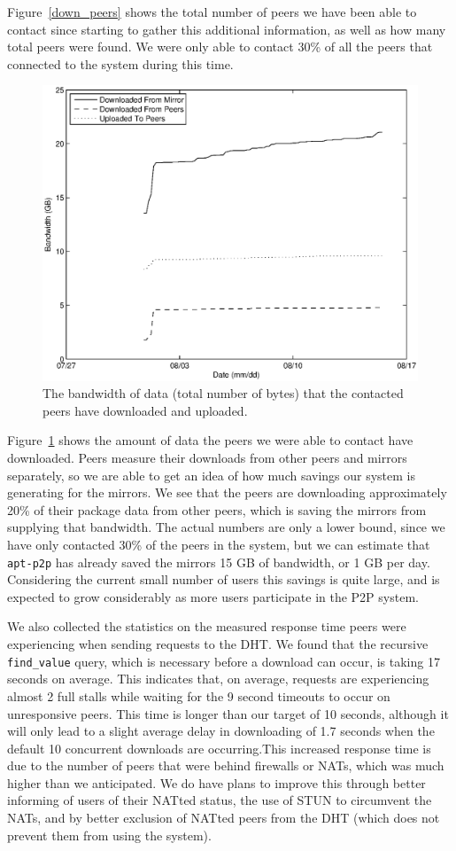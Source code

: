 \documentclass[conference]{IEEEtran}
\begin{document}
Figure~\ref{down_peers} shows the total number of peers we have been
able to contact since starting to gather this additional
information, as well as how many total peers were found. We were
only able to contact 30\% of all the peers that connected to the
system during this time.

\begin{figure}
\centering
\includegraphics[width=0.80\columnwidth]{AptP2PDownloaded-bw.eps}
\caption{The bandwidth of data (total number of bytes) that the contacted peers have
downloaded and uploaded.}
\label{down_bw}
\end{figure}

Figure~\ref{down_bw} shows the amount of data the peers we were able
to contact have downloaded. Peers measure their downloads from other
peers and mirrors separately, so we are able to get an idea of how
much savings our system is generating for the mirrors. We see that
the peers are downloading approximately 20\% of their package data
from other peers, which is saving the mirrors from supplying that
bandwidth. The actual numbers are only a lower bound, since we have
only contacted 30\% of the peers in the system, but we can estimate
that \texttt{apt-p2p} has already saved the mirrors 15 GB of
bandwidth, or 1 GB per day. Considering the current small number of
users this savings is quite large, and is expected to grow
considerably as more users participate in the P2P system.

We also collected the statistics on the measured response time peers
were experiencing when sending requests to the DHT. We found that
the recursive \texttt{find\_value} query, which is necessary before
a download can occur, is taking 17 seconds on average. This
indicates that, on average, requests are experiencing almost 2 full
stalls while waiting for the 9 second timeouts to occur on
unresponsive peers. This time is longer than our target of 10 seconds,
although it will only lead to a slight average delay in downloading
of 1.7 seconds when the default 10 concurrent downloads are
occurring.This increased response time is due to the number of peers
that were behind firewalls or NATs, which was much higher than we
anticipated. We do have plans to improve this through better
informing of users of their NATted status, the use of STUN
\cite{STUN} to circumvent the NATs, and by better exclusion of
NATted peers from the DHT (which does not prevent them from using
the system).
\end{document}
